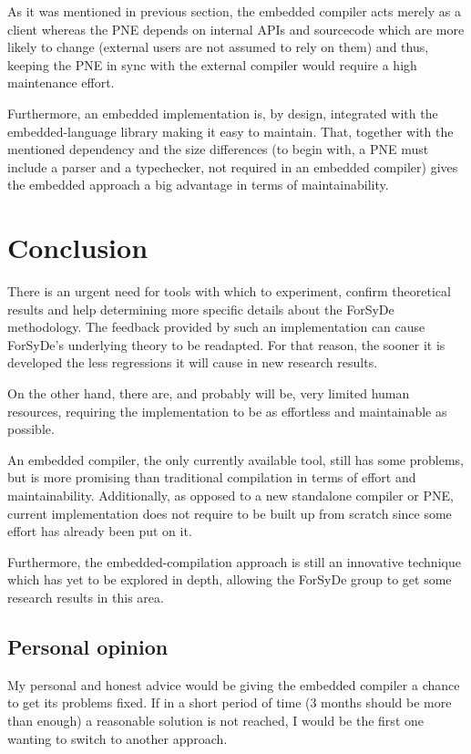 \documentclass[a4paper,twoside,11pt]{article}
\begin{document}
As it was mentioned in previous section, the embedded compiler acts merely as
a client whereas the PNE depends on internal APIs and sourcecode which are more
likely to change (external users are not assumed to rely on them) and thus,
keeping the PNE in sync with the external compiler would require a high
maintenance effort.

Furthermore, an embedded implementation is, by design, integrated with the
embedded-language library making it easy to maintain. That, together with the
mentioned dependency and the size differences (to begin with, a PNE must
include a parser and a typechecker, not required in an embedded compiler)
gives the embedded approach a big advantage in terms of maintainability.

\section{Conclusion}

There is an urgent need for tools with which to experiment, confirm
theoretical results and help determining more specific details about the
ForSyDe methodology. The feedback provided by such an implementation can cause
ForSyDe's underlying theory to be readapted. For that reason, the sooner it is
developed the less regressions it will cause in new research results.

On the other hand, there are, and probably will be, very limited human
resources, requiring the implementation to be as effortless and maintainable
as possible.

An embedded compiler, the only currently available tool, still has some
problems, but is more promising than traditional compilation in terms of
effort and maintainability. Additionally, as opposed to a new standalone
compiler or PNE, current implementation does not require to be built up from
scratch since some effort has already been put on it.

Furthermore, the embedded-compilation approach is still an innovative
technique which has yet to be explored in depth, allowing the ForSyDe group to
get some research results in this area.

\subsection{Personal opinion}

My personal and honest advice would be giving the embedded compiler a chance
to get its problems fixed. If in a short period of time (3 months should be
more than enough) a reasonable solution is not reached, I would be the first
one wanting to switch to another approach. 
\end{document}
